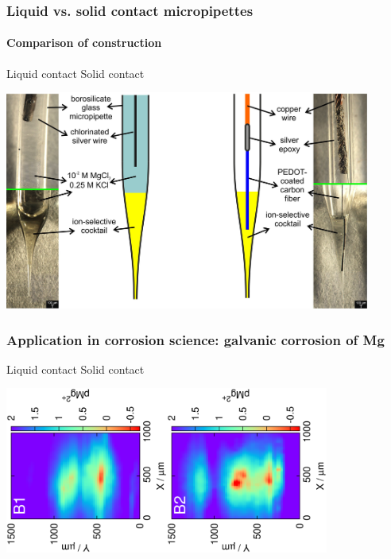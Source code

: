 \documentclass{beamer}
\begin{document}
\begin{frame}
\frametitle{Liquid vs. solid contact micropipettes}
\framesubtitle{Comparison of construction}
\begin{center}
\quad\quad\quad\quad Liquid contact \hfill Solid contact \quad\quad\quad\quad

\includegraphics[width=0.9\textwidth]{liquid_solid.jpg}
\end{center}
\end{frame}


\begin{frame}
	\frametitle{Application in corrosion science: galvanic corrosion of Mg} 
	\centering
	\quad\quad\quad\quad Liquid contact \hfill Solid contact \quad\quad\quad\quad\quad

	\includegraphics[trim = 10mm 30mm 0mm 20mm, clip, width=0.4\textwidth, angle=-90]{liquid_coupled.eps}\includegraphics[trim = 10mm 30mm 0mm 20mm, clip, width=0.4\textwidth, angle=-90]{solid_coupled.eps}
\end{frame}
\end{document}
